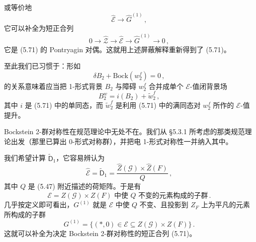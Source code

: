 
或等价地
\begin{equation}
  \widehat{\mathcal{E}} \to \widehat{G}^{(1)}\,, \tag{5.80}
\end{equation}
它可以补全为短正合列
\begin{equation}
  0 \to \widehat{\mathcal{Z}} \to \widehat{\mathcal{E}} \to \widehat{G}^{(1)} \to 0\,, \tag{5.81}
\end{equation}
它是 (5.71) 的 Pontryagin 对偶。这就用上述屏蔽解释重新得到了 (5.71)。

至此我们已习惯于：形如
\begin{equation}
  \delta B_2 + \mathrm{Bock}\left(w_2^f\right) = 0\,, \tag{5.82}
\end{equation}
的关系意味着应当把 1-形式背景 $B_2$ 与障碍 $w_2^f$ 合并成单个 $\mathcal{E}$-值闭背景场
\begin{equation}
  B_2^w = i(B_2) + \widetilde{w}_2^f\,, \tag{5.83}
\end{equation}
其中 $i$ 是 (5.71) 中的单同态，而 $\widetilde{w}_2^f$ 是利用 (5.71) 中的满同态对 $w_2^f$ 所作的 $\mathcal{E}$-值提升。

Bockstein 2-群对称性在规范理论中无处不在。我们从 §5.3.1 所考虑的那类规范理论出发（那里已算出 0-形式对称群），并把电 1-形式对称性一并纳入其中。

我们希望计算 $\widetilde{\mathsf{D}}_1$，它容易辨认为
\begin{equation}
  \widehat{\mathcal{E}} = \widetilde{\mathsf{D}}_1 = \frac{\widehat{Z}(\mathcal{G}) \times \widehat{Z}(F)}{Q}\,, \tag{5.84}
\end{equation}
其中 $Q$ 是 (5.47) 附近描述的荷矩阵。于是有
\begin{equation}
  \mathcal{E} = \text{$Z(\mathcal{G}) \times Z(F)$ 中使 $Q$ 不变的元素构成的子群}\,. \tag{5.85}
\end{equation}
几乎按定义即可看出，$G^{(1)}$ 就是 $\mathcal{E}$ 中使 $Q$ 不变、且投影到 $Z_F$ 上为平凡的元素所构成的子群
\begin{equation}
  G^{(1)} = \{(*,0) \in \mathcal{E} \subseteq Z(\mathcal{G}) \times Z(F)\}\,. \tag{5.86}
\end{equation}
这就可以补全为决定 Bockstein 2-群对称性的短正合列 (5.71)。

